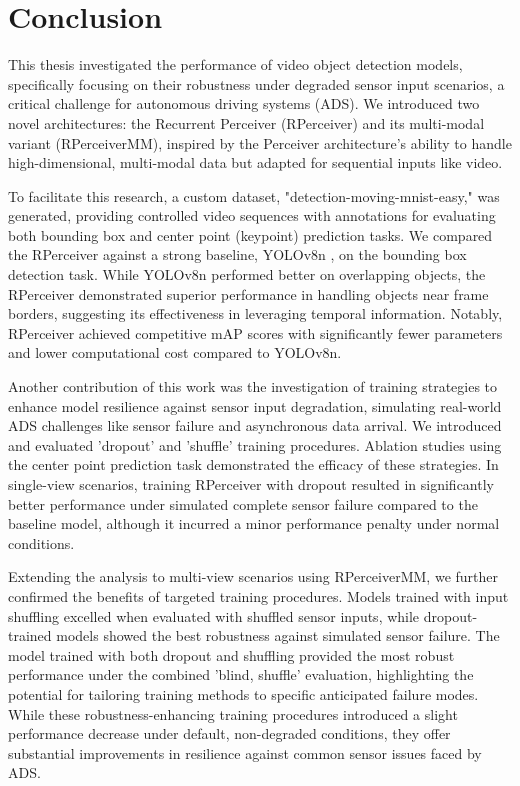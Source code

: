 \section{Conclusion} \label{Conclusion}

This thesis investigated the performance of video object detection models, specifically focusing on their robustness under degraded sensor input scenarios, a critical challenge for autonomous driving systems (ADS). We introduced two novel architectures: the Recurrent Perceiver (RPerceiver) and its multi-modal variant (RPerceiverMM), inspired by the Perceiver architecture's \cite{jaeglePerceiverGeneralPerception2021} ability to handle high-dimensional, multi-modal data but adapted for sequential inputs like video. 

To facilitate this research, a custom dataset, "detection-moving-mnist-easy," was generated, providing controlled video sequences with annotations for evaluating both bounding box and center point (keypoint) prediction tasks. 
We compared the RPerceiver against a strong baseline, YOLOv8n \cite{Jocher_Ultralytics_YOLO_2023}, on the bounding box detection task. 
While YOLOv8n performed better on overlapping objects, the RPerceiver demonstrated superior performance in handling objects near frame borders, suggesting its effectiveness in leveraging temporal information. 
Notably, RPerceiver achieved competitive mAP scores with significantly fewer parameters and lower computational cost compared to YOLOv8n. 

Another contribution of this work was the investigation of training strategies to enhance model resilience against sensor input degradation, simulating real-world ADS challenges like sensor failure and asynchronous data arrival. 
We introduced and evaluated 'dropout' and 'shuffle' training procedures. 
Ablation studies using the center point prediction task demonstrated the efficacy of these strategies. In single-view scenarios, training RPerceiver with dropout resulted in significantly better performance under simulated complete sensor failure compared to the baseline model, although it incurred a minor performance penalty under normal conditions. 

Extending the analysis to multi-view scenarios using RPerceiverMM, we further confirmed the benefits of targeted training procedures. Models trained with input shuffling excelled when evaluated with shuffled sensor inputs, while dropout-trained models showed the best robustness against simulated sensor failure. 
The model trained with both dropout and shuffling provided the most robust performance under the combined 'blind, shuffle' evaluation, highlighting the potential for tailoring training methods to specific anticipated failure modes. 
While these robustness-enhancing training procedures introduced a slight performance decrease under default, non-degraded conditions, they offer substantial improvements in resilience against common sensor issues faced by ADS. 

